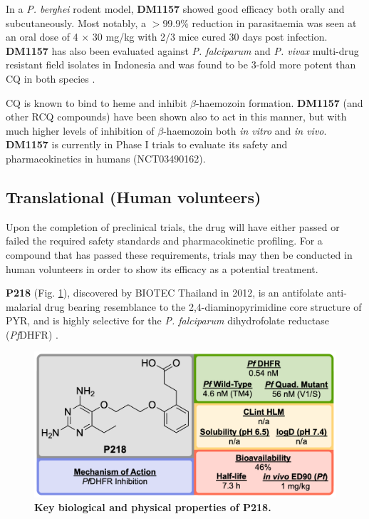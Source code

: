 \documentclass[twocolumn]{bmcart}%
\begin{document}
In a \textit{P. berghei} rodent model, \textbf{DM1157} showed good efficacy both orally and subcutaneously. Most notably, a $>$99.9\% reduction in parasitaemia was seen at an oral dose of 4 $\times$ 30 mg/kg with 2/3 mice cured 30 days post infection. \textbf{DM1157} has also been evaluated against \textit{P. falciparum} and \textit{P. vivax} multi-drug resistant field isolates in Indonesia and was found to be 3-fold more potent than CQ in both species \cite{Wirjanata2015}.

CQ is known to bind to heme and inhibit $\beta$-haemozoin formation. \textbf{DM1157} (and other RCQ compounds) have been shown also to act in this manner, but with much higher levels of inhibition of $\beta$-haemozoin both \textit{in vitro} and \textit{in vivo}. \textbf{DM1157} is currently in Phase I trials to evaluate its safety and pharmacokinetics in humans (NCT03490162).

\subsection*{Translational (Human volunteers)}
Upon the completion of preclinical trials, the drug will have either passed or failed the required safety standards and pharmacokinetic profiling. For a compound that has passed these requirements, trials may then be conducted in human volunteers in order to show its efficacy as a potential treatment.

\hrulefill

\textbf{P218} (Fig. \ref{Figure18}), discovered by BIOTEC Thailand in 2012, is an antifolate anti-malarial drug bearing resemblance to the 2,4-diaminopyrimidine core structure of PYR, and is highly selective for the \textit{P. falciparum} dihydrofolate reductase (\textit{Pf}DHFR) \cite{Yuthavong2012}.

\begin{figure}[h]
	\includegraphics [scale=0.575] {Figure18}
	\caption{\bf Key biological and physical properties of P218.}
	\label{Figure18}
\end{figure}
\end{document}
